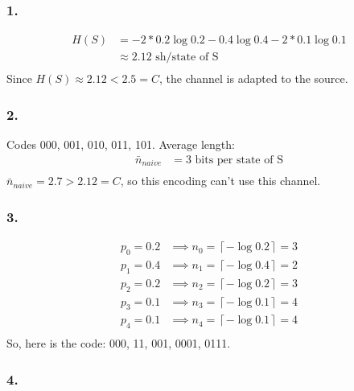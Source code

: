 \documentclass{article}
\newcommand{\1}{\mathbf{1}}
\begin{document}
\subsubsection{1.}
\begin{align*}
  H(S)
  &= - 2*0.2 \log 0.2 - 0.4 \log 0.4 - 2*0.1 \log 0.1 \\
  &\approx 2.12 \text{ sh/state of S} \\
\end{align*}
Since $H(S) \approx 2.12 < 2.5 = C$, the channel is adapted to the source.

\subsubsection{2.}
Codes 000, 001, 010, 011, 101. Average length:
\begin{align*}
  \bar{n}_{naive} 
  &= 3 \text{ bits per state of S} \\
\end{align*}
$\bar{n}_{naive} = 2.7 > 2.12 = C$, so this encoding can't use this channel.

\subsubsection{3.}
\begin{align*}
  p_0 = 0.2 &\implies n_0 = \left\lceil - \log 0.2 \right\rceil = 3 \\
  p_1 = 0.4 &\implies n_1 = \left\lceil - \log 0.4 \right\rceil = 2 \\
  p_2 = 0.2 &\implies n_2 = \left\lceil - \log 0.2 \right\rceil = 3 \\
  p_3 = 0.1 &\implies n_3 = \left\lceil - \log 0.1 \right\rceil = 4 \\
  p_4 = 0.1 &\implies n_4 = \left\lceil - \log 0.1 \right\rceil = 4 \\
\end{align*}
So, here is the code: 000, 11, 001, 0001, 0111.

\subsubsection{4.}
\end{document}
